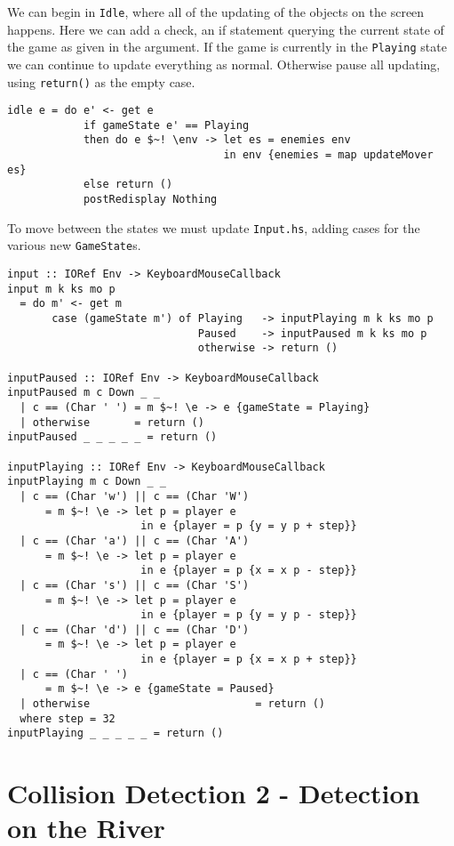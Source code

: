 \documentclass[12pt, a4paper]{report}
\begin{document}
We can begin in \verb|Idle|, where all of the updating of the objects on the screen happens.
Here we can add a check, an if statement querying the current state of the game as given in the argument.
If the game is currently in the \verb|Playing| state we can continue to update everything as normal.
Otherwise pause all updating, using \verb|return()| as the empty case.

\begin{lstlisting}
idle e = do e' <- get e
            if gameState e' == Playing
            then do e $~! \env -> let es = enemies env
                                  in env {enemies = map updateMover es}
            else return ()
            postRedisplay Nothing
\end{lstlisting}

To move between the states we must update \verb|Input.hs|, adding cases for the various new \verb|GameState|s.

\begin{lstlisting}
input :: IORef Env -> KeyboardMouseCallback
input m k ks mo p
  = do m' <- get m
       case (gameState m') of Playing   -> inputPlaying m k ks mo p
                              Paused    -> inputPaused m k ks mo p
                              otherwise -> return ()

inputPaused :: IORef Env -> KeyboardMouseCallback
inputPaused m c Down _ _
  | c == (Char ' ') = m $~! \e -> e {gameState = Playing}
  | otherwise       = return ()
inputPaused _ _ _ _ _ = return ()

inputPlaying :: IORef Env -> KeyboardMouseCallback
inputPlaying m c Down _ _
  | c == (Char 'w') || c == (Char 'W')
      = m $~! \e -> let p = player e
                     in e {player = p {y = y p + step}}
  | c == (Char 'a') || c == (Char 'A')
      = m $~! \e -> let p = player e
                     in e {player = p {x = x p - step}}
  | c == (Char 's') || c == (Char 'S')
      = m $~! \e -> let p = player e
                     in e {player = p {y = y p - step}}
  | c == (Char 'd') || c == (Char 'D')
      = m $~! \e -> let p = player e
                     in e {player = p {x = x p + step}}
  | c == (Char ' ')
      = m $~! \e -> e {gameState = Paused}
  | otherwise                          = return ()
  where step = 32
inputPlaying _ _ _ _ _ = return ()
\end{lstlisting}

\section{Collision Detection 2 - Detection on the River}
\end{document}
